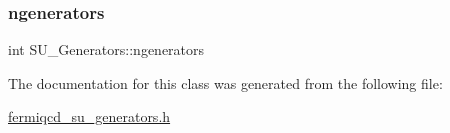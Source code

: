 \mbox{\label{class_s_u___generators_a0ad4b16aa28e9eabeb738634efa1fa23}} 
\subsubsection{\texorpdfstring{ngenerators}{ngenerators}}
{\footnotesize\ttfamily int S\+U\+\_\+\+Generators\+::ngenerators}



The documentation for this class was generated from the following file\+:\begin{DoxyCompactItemize}
\item 
\hyperlink{fermiqcd__su__generators_8h}{fermiqcd\+\_\+su\+\_\+generators.\+h}\end{DoxyCompactItemize}
